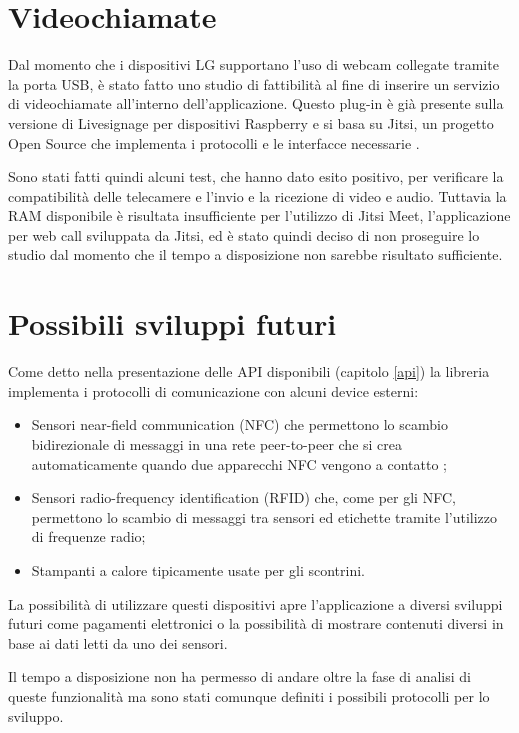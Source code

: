 \section{Videochiamate}

Dal momento che i dispositivi LG supportano l'uso di webcam collegate tramite la porta USB, è stato fatto uno studio di fattibilità al fine di inserire un servizio di videochiamate all'interno dell'applicazione.
Questo plug-in è già presente sulla versione di Livesignage per dispositivi Raspberry e si basa su Jitsi, un progetto Open Source che implementa i protocolli e le interfacce necessarie \cite{jitsi}.

Sono stati fatti quindi alcuni test, che hanno dato esito positivo, per verificare la compatibilità delle telecamere e l'invio e la ricezione di video e audio. Tuttavia la RAM disponibile è risultata insufficiente per l'utilizzo di Jitsi Meet, l'applicazione per web call sviluppata da Jitsi, ed è stato quindi deciso di non proseguire lo studio dal momento che il tempo a disposizione non sarebbe risultato sufficiente.

\section{Possibili sviluppi futuri} \label{future_implementazioni}

Come detto nella presentazione delle API disponibili (capitolo \ref*{api}) la libreria  implementa i protocolli di comunicazione con alcuni device esterni:
\begin{itemize}
    \item Sensori near-field communication (NFC) che permettono lo scambio bidirezionale di messaggi in una rete peer-to-peer che si crea automaticamente quando due apparecchi NFC vengono a contatto \cite{nfc};
    \item Sensori radio-frequency identification (RFID) che, come per gli NFC, permettono lo scambio di messaggi tra sensori ed etichette tramite l'utilizzo di frequenze radio;
    \item Stampanti a calore tipicamente usate per gli scontrini. 
\end{itemize}

La possibilità di utilizzare questi dispositivi apre l'applicazione a diversi sviluppi futuri come pagamenti elettronici o la possibilità di mostrare contenuti diversi in base ai dati letti da uno dei sensori.

Il tempo a disposizione non ha permesso di andare oltre la fase di analisi di queste funzionalità ma sono stati comunque definiti i possibili protocolli per lo sviluppo.